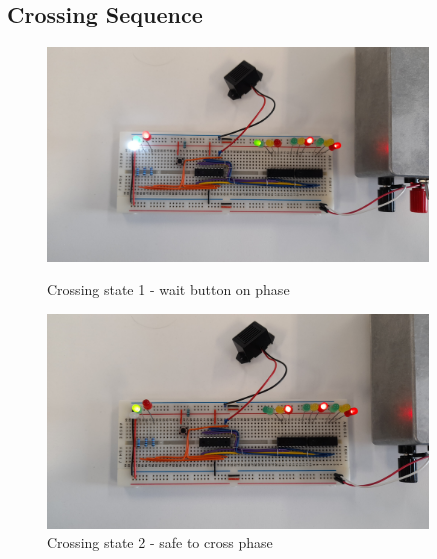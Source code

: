 \subsection{Crossing Sequence}
\begin{figure}[H]
    \begin{minipage}{0.45\textwidth}
        \centering
        \includegraphics[width=0.9\textwidth]{images/final-testing/state_c_1.jpg}
        \caption{Crossing state 1 - wait button on phase}
        \label{fig:state_c_1}
    \end{minipage}\hfill
    \begin{minipage}{0.45\textwidth}
        \centering
        \includegraphics[width=0.9\textwidth]{images/final-testing/state_c_2.jpg}
        \caption{Crossing state 2 - safe to cross phase}
        \label{fig:state_c_2}
    \end{minipage}
\end{figure}